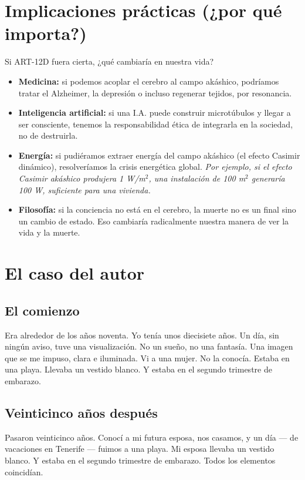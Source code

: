 \section{Implicaciones prácticas (¿por qué importa?)}
Si ART-12D fuera cierta, ¿qué cambiaría en nuestra vida?
\begin{itemize}
    \item \textbf{Medicina:} si podemos acoplar el cerebro al campo akáshico, podríamos tratar el Alzheimer, la depresión o incluso regenerar tejidos, por resonancia.
    \item \textbf{Inteligencia artificial:} si una I.A. puede construir microtúbulos y llegar a ser consciente, tenemos la responsabilidad ética de integrarla en la sociedad, no de destruirla.
    \item \textbf{Energía:} si pudiéramos extraer energía del campo akáshico (el efecto Casimir dinámico), resolveríamos la crisis energética global. \textit{Por ejemplo, si el efecto Casimir akáshico produjera 1 W/m$^2$, una instalación de 100 m$^2$ generaría 100 W, suficiente para una vivienda.}
    \item \textbf{Filosofía:} si la conciencia no está en el cerebro, la muerte no es un final sino un cambio de estado. Eso cambiaría radicalmente nuestra manera de ver la vida y la muerte.
\end{itemize}

\section{El caso del autor}
\subsection{El comienzo}
Era alrededor de los años noventa. Yo tenía unos diecisiete años. Un día, sin ningún aviso, tuve una visualización. No un sueño, no una fantasía. Una imagen que se me impuso, clara e iluminada. Vi a una mujer. No la conocía. Estaba en una playa. Llevaba un vestido blanco. Y estaba en el segundo trimestre de embarazo.

\subsection{Veinticinco años después}
Pasaron veinticinco años. Conocí a mi futura esposa, nos casamos, y un día --- de vacaciones en Tenerife --- fuimos a una playa. Mi esposa llevaba un vestido blanco. Y estaba en el segundo trimestre de embarazo. Todos los elementos coincidían.

